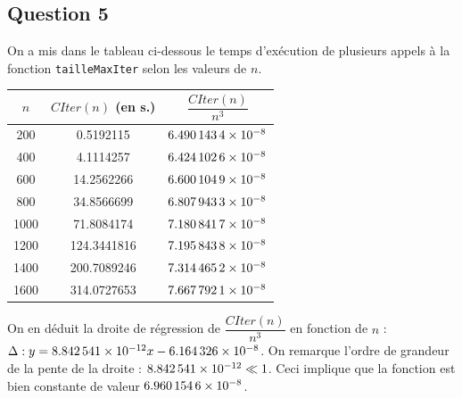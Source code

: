 \documentclass[12pt,a4paper]{article}
\begin{document}
\subsection*{Question 5}
On a mis dans le tableau ci-dessous le temps d'ex\'ecution de plusieurs appels \`a la fonction \texttt{tailleMaxIter} selon les valeurs de $n$.
	\begin{center}
	\begin{tabular}{|c|cc|}
	\hline $n$ & $CIter(n)$ (en s.) & $\dfrac{CIter(n)}{n^3}$ \\[6pt]
	\hline 200 & 0.5192115 & $\num{6.4901434E-08}$ \\ 
	\hline 400 & 4.1114257 & $\num{6.4241026E-08}$ \\ 
	\hline 600 & 14.2562266 & $\num{6.6001049E-08}$ \\ 
	\hline 800 & 34.8566699 & $\num{6.8079433E-08}$ \\
	\hline 1000 & 71.8084174 & $\num{7.1808417E-08}$ \\ 
	\hline 1200 & 124.3441816 & $\num{7.1958438E-08}$ \\ 
	\hline 1400 & 200.7089246 & $\num{7.3144652E-08}$ \\
	\hline 1600 & 314.0727653 & $\num{7.6677921E-08}$ \\
	\hline
	\end{tabular}
	\end{center}
	
	On en d\'eduit la droite de r\'egression de $\dfrac{CIter(n)}{n^3}$ en fonction de $n$ : $\\\Delta : y = \num{8.842541E-12}x - \num{6.164326E-08}$. On remarque l'ordre de grandeur de la pente de la droite : $\num{8.842541E-12} \ll 1$. Ceci implique que la fonction est bien constante de valeur $\num{6.9601546E-08}$. 
\end{document}
